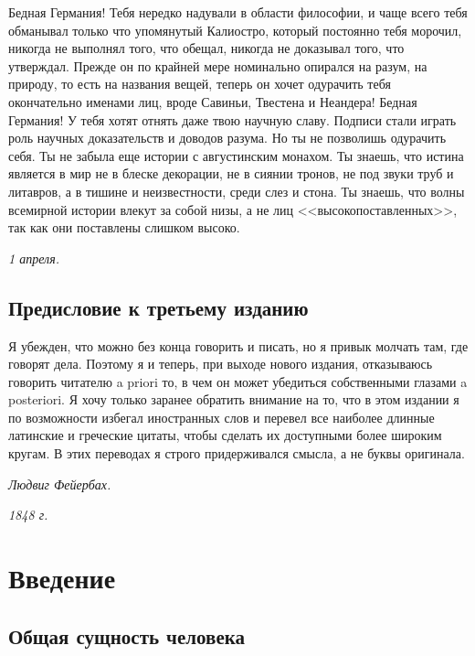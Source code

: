 \documentclass[12pt,oneside]{book}
\begin{document}
Бедная Германия! Тебя нередко надували в области философии, и чаще всего тебя обманывал только что упомянутый Калиостро, который постоянно тебя морочил, никогда не выполнял того, что обещал, никогда не доказывал того, что утверждал. Прежде он по крайней мере номинально опирался на разум, на природу, то есть на названия вещей, теперь он хочет одурачить тебя окончательно именами лиц, вроде Савиньи, Твестена и Неандера! Бедная Германия! У тебя хотят отнять даже твою научную славу. Подписи стали играть роль научных доказательств и доводов разума. Но ты не позволишь одурачить себя. Ты не забыла еще истории с августинским монахом. Ты знаешь, что истина является в мир не в блеске декорации, не в сиянии тронов, не под звуки труб и литавров, а в тишине и неизвестности, среди слез и стона. Ты знаешь, что волны всемирной истории влекут за собой низы, а не лиц <<высокопоставленных>>, так как они поставлены слишком высоко.

\bigskip

\hfill\emph{1 апреля.}

\bigskip

{}
\chapter*{Предисловие к третьему изданию}
Я убежден, что можно без конца говорить и писать, но я привык молчать там, где говорят дела. Поэтому я и теперь, при выходе нового издания, отказываюсь говорить читателю a priori то, в чем он может убедиться собственными глазами a posteriori. Я хочу только заранее обратить внимание на то, что в этом издании я по возможности избегал иностранных слов и перевел все наиболее длинные латинские и греческие цитаты, чтобы сделать их доступными более широким кругам. В этих переводах я строго придерживался смысла, а не буквы оригинала.

\bigskip

\hfill\emph{Людвиг Фейербах.}

\hfill\emph{1848 г.}




\part{Введение}





\chapter{Общая сущность человека}
\end{document}
